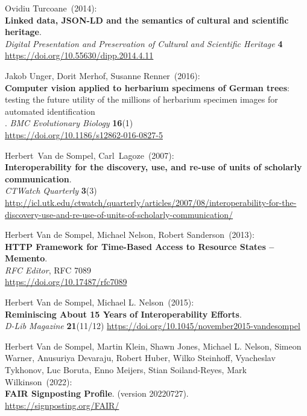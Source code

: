 \begin{thebibliography}{9}
Ovidiu Turcoane~(2014): \\
\textbf{Linked data, {JSON-LD} and the semantics of cultural and scientific heritage}. \\
\emph{Digital Presentation and Preservation of Cultural and Scientific Heritage} \textbf{4} \\
\url{https://doi.org/10.55630/dipp.2014.4.11}

Jakob Unger, Dorit Merhof, Susanne Renner~(2016): \\
\textbf{Computer vision applied to
herbarium specimens of German trees}: testing the future utility of the
millions of herbarium specimen images for automated identification\\. 
\emph{BMC Evolutionary Biology} \textbf{16}(1)\\
\url{https://doi.org/10.1186/s12862-016-0827-5}

Herbert~Van de Sompel, Carl~Lagoze~(2007): \\
\textbf{Interoperability for the discovery, use, and re-use of units of
scholarly communication}.\\
\emph{CTWatch Quarterly} \textbf{3}(3)\\
\url{http://icl.utk.edu/ctwatch/quarterly/articles/2007/08/interoperability-for-the-discovery-use-and-re-use-of-units-of-scholarly-communication/}

Herbert Van de Sompel, Michael Nelson, Robert Sanderson~(2013): \\
\textbf{{HTTP Framework} for {Time-Based Access} to {Resource States} --
{Memento}}.\\
\emph{RFC Editor}, RFC 7089\\
\url{https://doi.org/10.17487/rfc7089}

Herbert Van de Sompel, Michael L. Nelson~(2015): \\
\textbf{Reminiscing About 15 Years of Interoperability Efforts}.\\
\emph{D-Lib Magazine} \textbf{21}(11/12)
\url{https://doi.org/10.1045/november2015-vandesompel}

Herbert Van de Sompel, Martin Klein, Shawn
Jones, Michael L. Nelson, Simeon Warner, Anusuriya Devaraju, Robert
Huber, Wilko Steinhoff, Vyacheslav Tykhonov, Luc Boruta, Enno Meijers,
Stian Soiland-Reyes, Mark Wilkinson~(2022): \\
\textbf{FAIR Signposting Profile}. (version 20220727).\\
\url{https://signposting.org/FAIR/}


\end{thebibliography}
